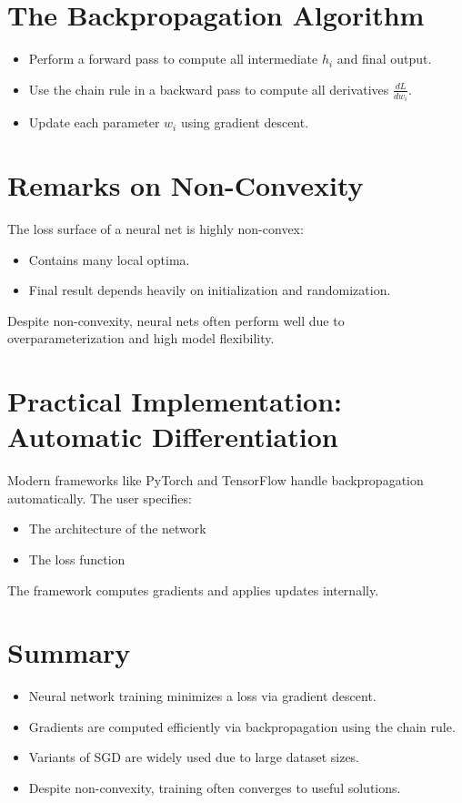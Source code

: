 \documentclass[11pt]{article}
\begin{document}
\section{The Backpropagation Algorithm}

\begin{itemize}
    \item Perform a forward pass to compute all intermediate $h_i$ and final output.
    \item Use the chain rule in a backward pass to compute all derivatives $\frac{dL}{dw_i}$.
    \item Update each parameter $w_i$ using gradient descent.
\end{itemize}

\section{Remarks on Non-Convexity}

The loss surface of a neural net is highly non-convex:
\begin{itemize}
    \item Contains many local optima.
    \item Final result depends heavily on initialization and randomization.
\end{itemize}

Despite non-convexity, neural nets often perform well due to overparameterization and high model flexibility.

\section{Practical Implementation: Automatic Differentiation}

Modern frameworks like PyTorch and TensorFlow handle backpropagation automatically. The user specifies:
\begin{itemize}
    \item The architecture of the network
    \item The loss function
\end{itemize}
The framework computes gradients and applies updates internally.

\section{Summary}

\begin{itemize}
    \item Neural network training minimizes a loss via gradient descent.
    \item Gradients are computed efficiently via backpropagation using the chain rule.
    \item Variants of SGD are widely used due to large dataset sizes.
    \item Despite non-convexity, training often converges to useful solutions.
\end{itemize}
\end{document}
